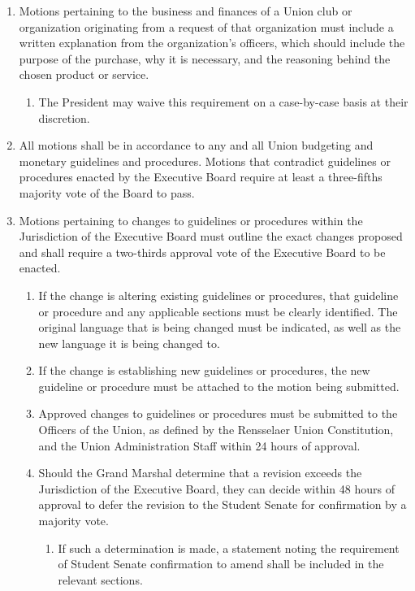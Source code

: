 \begin{enumerate}
\begin{enumerate}
  \end{enumerate}
\item Motions pertaining to the business and finances of a Union club or organization originating from a request of that organization must include a written explanation from the organization’s officers, which should include the purpose of the purchase, why it is necessary, and the reasoning behind the chosen product or service.
  \begin{enumerate}
  \item The President may waive this requirement on a case-by-case basis at their discretion.
  \end{enumerate}
\item All motions shall be in accordance to any and all Union budgeting and monetary guidelines and procedures. Motions that contradict guidelines or procedures enacted by the Executive Board require at least a three-fifths majority vote of the Board to pass.
\item Motions pertaining to changes to guidelines or procedures within the Jurisdiction of the Executive Board must outline the exact changes proposed and shall require a two-thirds approval vote of the Executive Board to be enacted.
  \begin{enumerate}
  \item If the change is altering existing guidelines or procedures, that guideline or procedure and any applicable sections must be clearly identified. The original language that is being changed must be indicated, as well as the new language it is being changed to.
  \item If the change is establishing new guidelines or procedures, the new guideline or procedure must be attached to the motion being submitted.
  \item Approved changes to guidelines or procedures must be submitted to the Officers of the Union, as defined by the Rensselaer Union Constitution, and the Union Administration Staff within 24 hours of approval.
  \item Should the Grand Marshal determine that a revision exceeds the Jurisdiction of the Executive Board, they can decide within 48 hours of approval to defer the revision to the Student Senate for confirmation by a majority vote.
    \begin{enumerate}
    \item If such a determination is made, a statement noting the requirement of Student Senate confirmation to amend shall be included in the relevant sections.

\end{enumerate}
\end{enumerate}
\end{enumerate}
